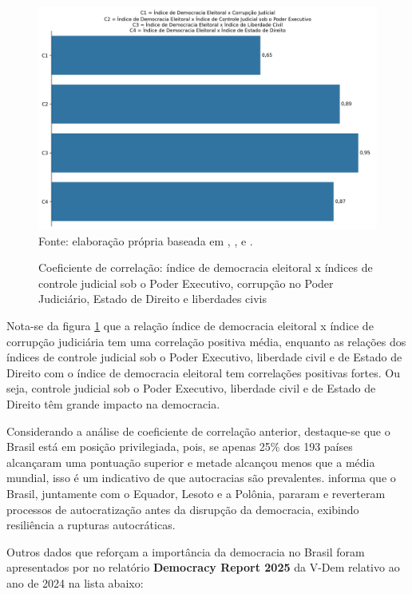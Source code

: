 \begin{figure}[H]
	\centering
	\caption{Coeficiente de correlação: índice de democracia eleitoral x índices de controle judicial sob o Poder Executivo, corrupção no Poder Judiciário, Estado de Direito e liberdades civis}
	\includegraphics[width=1\linewidth]{figuras/comparacao_democracia}
	\label{fig:comparacao_democracia}
	\footnotesize{Fonte: elaboração própria baseada em \cite{rule-of-law-index}, \cite{jus_constraints_on_gov}, \cite{judicial-corruption-score} e \cite{human-rights-index-vdem}.}
\end{figure}

Nota-se da figura \ref{fig:comparacao_democracia} que a relação índice de democracia eleitoral x índice de corrupção judiciária tem uma correlação positiva média, enquanto as relações dos índices de controle judicial sob o Poder Executivo, liberdade civil e de Estado de Direito com o índice de democracia eleitoral tem correlações positivas fortes. Ou seja, controle judicial sob o Poder Executivo, liberdade civil e de Estado de Direito têm grande impacto na democracia. 

Considerando a análise de coeficiente de correlação anterior, destaque-se que o Brasil está em posição privilegiada, pois, se apenas 25\% dos 193 países alcançaram uma pontuação superior e metade alcançou menos que a média mundial, isso é um indicativo de que autocracias são prevalentes. \cite{nord2025democracy} informa que o Brasil, juntamente com o Equador, Lesoto e a Polônia, pararam e reverteram processos de autocratização antes da disrupção da democracia, exibindo resiliência a rupturas autocráticas.

Outros dados que reforçam a importância da democracia no Brasil foram apresentados por \cite{nord2025democracy} no relatório \textbf{Democracy Report 2025} da V-Dem relativo ao ano de 2024 na lista abaixo:

